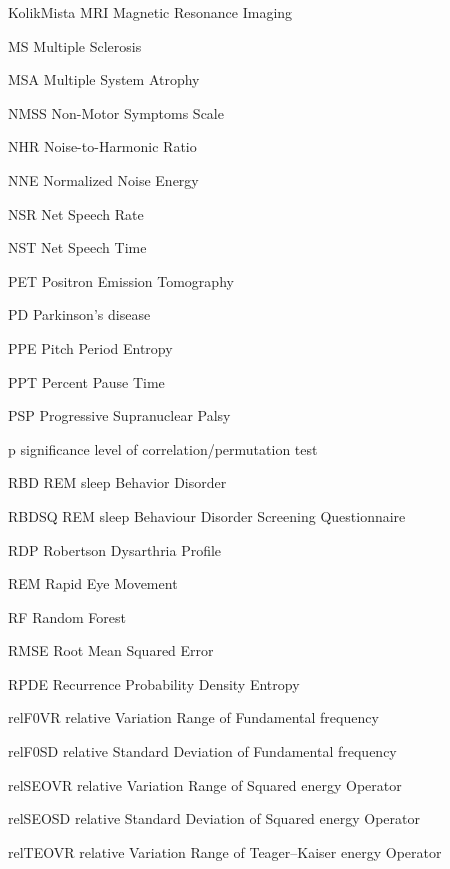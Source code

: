 \begin{seznamzkratek}{KolikMista}
		{MRI}
		{Magnetic Resonance Imaging}

		{MS}
		{Multiple Sclerosis}

		{MSA}
		{Multiple System Atrophy}

		{NMSS}
		{Non-Motor Symptoms Scale}

		{NHR}
		{Noise-to-Harmonic Ratio}

		{NNE}
		{Normalized Noise Energy}

		{NSR}
		{Net Speech Rate}

		{NST}
		{Net Speech Time}

		{PET}
		{Positron Emission Tomography}

		{PD}
		{Parkinson's disease}

		{PPE}
		{Pitch Period Entropy}

		{PPT}
		{Percent Pause Time}

		{PSP}
		{Progressive Supranuclear Palsy}

		{p}
		{significance level of correlation/permutation test}

		{RBD}
		{REM sleep Behavior Disorder}

		{RBDSQ}
		{REM sleep Behaviour Disorder Screening Questionnaire}

		{RDP}
		{Robertson Dysarthria Profile}

		{REM}
		{Rapid Eye Movement}

		{RF}
		{Random Forest}

		{RMSE}
		{Root Mean Squared Error}

		{RPDE}
		{Recurrence Probability Density Entropy}

		{relF0VR}
		{relative Variation Range of Fundamental frequency}

		{relF0SD}
		{relative Standard Deviation of Fundamental frequency}

		{relSEOVR}
		{relative Variation Range of Squared energy Operator}

		{relSEOSD}
		{relative Standard Deviation of Squared energy Operator}

		{relTEOVR}
		{relative Variation Range of Teager–Kaiser energy Operator}


\end{seznamzkratek}
